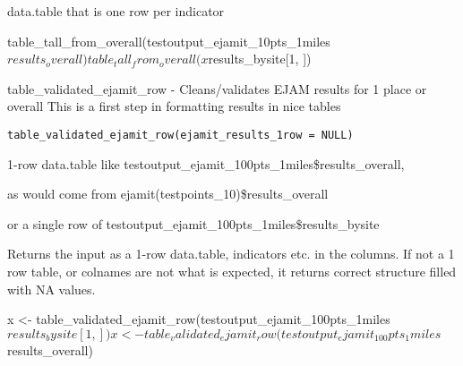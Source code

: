 \documentclass[a4paper]{book}
\begin{document}
%
\begin{Value}
data.table that is one row per indicator
\end{Value}
%
\begin{Examples}
\begin{ExampleCode}
 table_tall_from_overall(testoutput_ejamit_10pts_1miles$results_overall)
 table_tall_from_overall(x$results_bysite[1, ])
\end{ExampleCode}
\end{Examples}
%
\begin{Description}\relax
table\_validated\_ejamit\_row - Cleans/validates EJAM results for 1 place or overall
This is a first step in formatting results in nice tables
\end{Description}
%
\begin{Usage}
\begin{verbatim}
table_validated_ejamit_row(ejamit_results_1row = NULL)
\end{verbatim}
\end{Usage}
%
\begin{Arguments}
\begin{ldescription}
\item[\code{ejamit\_results\_1row}] 1-row data.table like testoutput\_ejamit\_100pts\_1miles\$results\_overall,

as would come from ejamit(testpoints\_10)\$results\_overall

or a single row of testoutput\_ejamit\_100pts\_1miles\$results\_bysite
\end{ldescription}
\end{Arguments}
%
\begin{Value}
Returns the input as a 1-row data.table, indicators etc. in the columns.
If not a 1 row table, or colnames are not what is expected, it returns correct structure filled with NA values.
\end{Value}
%
\begin{Examples}
\begin{ExampleCode}
  x <- table_validated_ejamit_row(testoutput_ejamit_100pts_1miles$results_bysite[ 1, ])
  x <- table_validated_ejamit_row(testoutput_ejamit_100pts_1miles$results_overall)
  
\end{ExampleCode}
\end{Examples}
\end{document}
